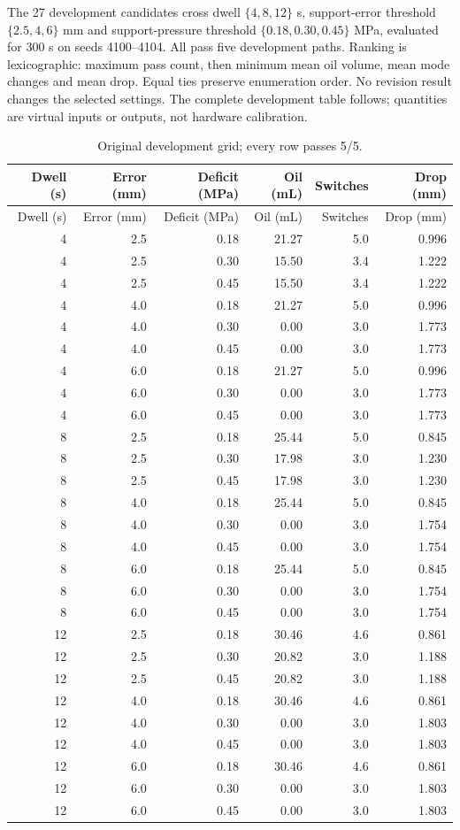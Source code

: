 \documentclass[11pt,a4paper]{article}
\begin{document}
The 27 development candidates cross dwell $\{4,8,12\}$ s, support-error threshold $\{2.5,4,6\}$ mm and support-pressure threshold $\{0.18,0.30,0.45\}$ MPa, evaluated for 300 s on seeds 4100--4104. All pass five development paths. Ranking is lexicographic: maximum pass count, then minimum mean oil volume, mean mode changes and mean drop. Equal ties preserve enumeration order. No revision result changes the selected settings. The complete development table follows; quantities are virtual inputs or outputs, not hardware calibration.
\begin{longtable}{rrrrrr}\caption{Original development grid; every row passes 5/5.}\\\toprule Dwell (s)&Error (mm)&Deficit (MPa)&Oil (mL)&Switches&Drop (mm)\\\midrule\endfirsthead
\toprule Dwell (s)&Error (mm)&Deficit (MPa)&Oil (mL)&Switches&Drop (mm)\\\midrule\endhead
4 & 2.5 & 0.18 & 21.27 & 5.0 & 0.996 \\
4 & 2.5 & 0.30 & 15.50 & 3.4 & 1.222 \\
4 & 2.5 & 0.45 & 15.50 & 3.4 & 1.222 \\
4 & 4.0 & 0.18 & 21.27 & 5.0 & 0.996 \\
4 & 4.0 & 0.30 & 0.00 & 3.0 & 1.773 \\
4 & 4.0 & 0.45 & 0.00 & 3.0 & 1.773 \\
4 & 6.0 & 0.18 & 21.27 & 5.0 & 0.996 \\
4 & 6.0 & 0.30 & 0.00 & 3.0 & 1.773 \\
4 & 6.0 & 0.45 & 0.00 & 3.0 & 1.773 \\
8 & 2.5 & 0.18 & 25.44 & 5.0 & 0.845 \\
8 & 2.5 & 0.30 & 17.98 & 3.0 & 1.230 \\
8 & 2.5 & 0.45 & 17.98 & 3.0 & 1.230 \\
8 & 4.0 & 0.18 & 25.44 & 5.0 & 0.845 \\
8 & 4.0 & 0.30 & 0.00 & 3.0 & 1.754 \\
8 & 4.0 & 0.45 & 0.00 & 3.0 & 1.754 \\
8 & 6.0 & 0.18 & 25.44 & 5.0 & 0.845 \\
8 & 6.0 & 0.30 & 0.00 & 3.0 & 1.754 \\
8 & 6.0 & 0.45 & 0.00 & 3.0 & 1.754 \\
12 & 2.5 & 0.18 & 30.46 & 4.6 & 0.861 \\
12 & 2.5 & 0.30 & 20.82 & 3.0 & 1.188 \\
12 & 2.5 & 0.45 & 20.82 & 3.0 & 1.188 \\
12 & 4.0 & 0.18 & 30.46 & 4.6 & 0.861 \\
12 & 4.0 & 0.30 & 0.00 & 3.0 & 1.803 \\
12 & 4.0 & 0.45 & 0.00 & 3.0 & 1.803 \\
12 & 6.0 & 0.18 & 30.46 & 4.6 & 0.861 \\
12 & 6.0 & 0.30 & 0.00 & 3.0 & 1.803 \\
12 & 6.0 & 0.45 & 0.00 & 3.0 & 1.803 \\
\bottomrule\end{longtable}
\end{document}
